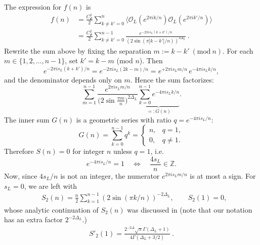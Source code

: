 \documentclass[11pt]{article}
\newcommand{\mO}{\mathcal{O}}
\newcommand{\nn}{\nonumber}
\begin{document}
The expression for $f(n)$ is
  \begin{align}\label{fnexpression}
    f(n) & =\frac{C_{\Psi}^{2}}{2}\sum_{k\neq k'=0}^{n}\langle \mO_{L}(e^{2\pi i k/n})\mO_{L}(e^{2\pi i k'/n})\rangle \nn    \\
         & =\frac{C_{\Psi}^{2}}{2}\sum_{k\neq k'=0}^{n-1}\frac{e^{-2\pi i s_L(k+k')/n}}{(2\sin(\pi |k-k'|/n))^{2\Delta_L}}\ .
  \end{align}
  Rewrite the sum above by fixing the separation $m:=k-k' \ (\mathrm{mod}\ n)$. For
  each $m\in\{1,2,\dots,n-1\}$, set $k'=k-m$ (mod $n$). Then
  \[
    e^{-2\pi i s_L (k+k')/n}= e^{-2\pi i s_L (2k-m)/n}= e^{+2\pi i s_L m/n}\,e^{-4\pi
    i s_L k/n},
  \]
  and the denominator depends only on $m$. Hence the sum factorizes:
  \begin{equation}
    \sum_{m=1}^{n-1}\frac{e^{2\pi i s_L m/n}}{\bigl(2\sin\frac{\pi m}{n}\bigr)^{2\Delta_L}}
    \underbrace{\sum_{k=0}^{n-1} e^{-4\pi i s_L k/n}}_{=:G(n)}.
  \end{equation}
  The inner sum $G(n)$ is a geometric series with ratio $q=e^{-4\pi i s_L/n}$:
  \[
    G(n)=\sum_{k=0}^{n-1}q^{k}=
    \begin{cases}
      n, & q=1,     \\
      0, & q\neq 1.
    \end{cases}
  \]
  Therefore $S(n)=0$ for integer $n$ unless $q=1$, i.e.
  \[
    e^{-4\pi i s_L/n}=1 \quad\Longleftrightarrow\quad \frac{4s_{L}}{n}\in\mathbb{Z}
    .
  \]
  Now, since $4s_{L}/n$ is not an integer, the numerator $e^{2\pi i s_L m/n}$ is
  at most a sign. For $s_L=0$, we are left with
  \begin{align}
     & S_{2}(n)=\frac{n}{2}\sum_{k=1}^{n-1}(2\sin(\pi k/n))^{-2\Delta_L},\qquad S_{2}(1)=0,
  \end{align}
  whose analytic continuation of $S_{2}(n)$ was discussed in
  \cite{calabrese2011entanglement} (note that our notation has an extra factor $2^{-2\Delta_L}$.)
  \begin{align}
    S'_{2}(1)=\frac{2^{-2\Delta}\sqrt{\pi}\Gamma(\Delta_{L}+1)}{4\Gamma(\Delta_{L}+3/2)}\ .
  \end{align}
\end{document}

